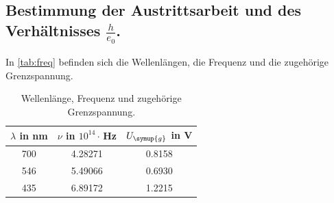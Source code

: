 \subsection{Bestimmung der Austrittsarbeit und des Verhältnisses $\frac{h}{e_0}$.}
\label{sec:Auswertungb}

In \autoref{tab:freq} befinden sich die Wellenlängen, die Frequenz und die zugehörige Grenzspannung. 
\begin{table}
    \centering 
    \caption{Wellenlänge, Frequenz und zugehörige Grenzspannung.}
\begin{tabular}{c c c}
    \toprule
    $\lambda$ in nm &$\nu$ in $10^14\cdot$\,Hz & $U_{\symup{g}}$ in V  \\
    \midrule
    700 & 4.28271 & 0.8158\\ 
546 & 5.49066 & 0.6930\\
435 & 6.89172 & 1.2215\\
    \bottomrule
\end{tabular}
\label{tab:freq}
\end{table}

